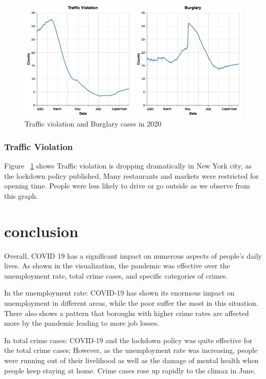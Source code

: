 \documentclass[conference]{IEEEtran}
\begin{document}
\begin{figure}[ht!]
    \centering
    \includegraphics[width=\linewidth]{images/TrafficAndBurglary.png}
    \caption{Traffic violation and Burglary cases in 2020}
    \label{fig:TrafficAndBurglary}
\end{figure}

\subsubsection{Traffic Violation}
Figure ~\ref{fig:TrafficAndBurglary} shows Traffic violation is dropping dramatically in New York city, as the lockdown policy published, Many restaurants and markets were restricted for opening time. People were less likely to drive or go outside as we observe from this graph.

\section{conclusion}
Overall, COVID 19 has a significant impact on numerous aspects of people's daily lives. As shown in the visualization, the pandemic was effective over the unemployment rate, total crime cases, and specific categories of crimes.

In the unemployment rate:
COVID-19 has shown its enormous impact on unemployment in different areas, while the poor suffer the most in this situation. There also shows a pattern that boroughs with higher crime rates are affected more by the pandemic leading to more job losses.

In total crime cases:
COVID-19 and the lockdown policy was quite effective for the total crime cases; However, as the unemployment rate was increasing, people were running out of their livelihood as well as the damage of mental health when people keep staying at home. Crime cases rose up rapidly to the climax in June.
\end{document}
